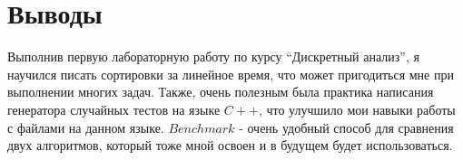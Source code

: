 \section{Выводы}
Выполнив первую лабораторную работу по курсу \enquote{Дискретный анализ}, я научился писать сортировки за линейное время, что может пригодиться мне при выполнении многих задач. Также, очень полезным была практика написания генератора случайных тестов на языке $C++$, что улучшило мои навыки работы с файлами на данном языке. $Benchmark$ - очень удобный способ для сравнения двух алгоритмов, который тоже мной освоен и в будущем будет использоваться. 
\pagebreak
